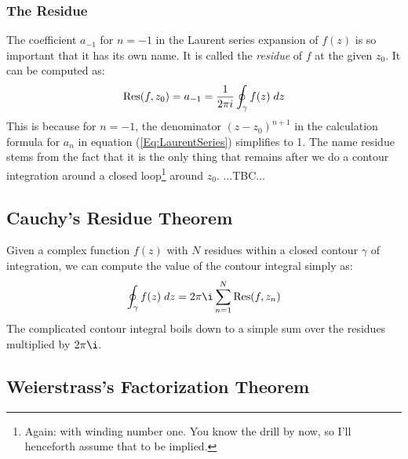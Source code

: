 \subsubsection{The Residue}
The coefficient $a_{-1}$ for $n=-1$ in the Laurent series expansion of $f(z)$ is so important that it has its own name. It is called the \emph{residue} of $f$ at the given $z_0$. It can be computed as:
\begin{equation}
\operatorname{Res}(f,z_0) = a_{-1} = \frac{1}{2 \pi i} \oint_{\gamma} f(z) \; dz
\end{equation}
This is because for $n=-1$, the denominator $(z-z_0)^{n+1}$ in the calculation formula for $a_n$ in equation (\ref{Eq:LaurentSeries}) simplifies to 1. The name residue stems from the fact that it is the only thing that remains after we do a contour integration around a closed loop\footnote{Again: with winding number one. You know the drill by now, so I'll henceforth assume that to be implied.} around $z_0$. ...TBC...




\subsection{Cauchy's Residue Theorem}
Given a complex function $f(z)$ with $N$ residues within a closed contour $\gamma$ of integration, we can compute the value of the contour integral simply as:
\begin{equation}
\oint_{\gamma} f(z) \; dz = 2 \pi \i \sum_{n=1}^{N} \Res(f, z_n)
\end{equation}
The complicated contour integral boils down to a simple sum over the residues multiplied by $2 \pi \i$.




\subsection{Weierstrass's Factorization Theorem}


